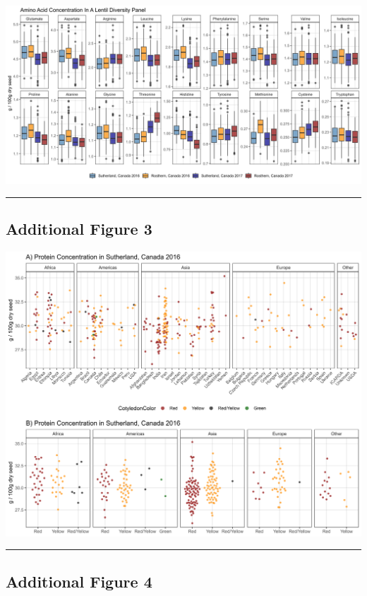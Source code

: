 \documentclass[
]{article}
\begin{document}
\includegraphics{Additional/Additional_Figure_02.jpg}

\begin{center}\rule{0.5\linewidth}{0.5pt}\end{center}

\hypertarget{additional-figure-3}{%
\subsection{Additional Figure 3}\label{additional-figure-3}}

\includegraphics{Additional/Additional_Figure_03.jpg}

\begin{center}\rule{0.5\linewidth}{0.5pt}\end{center}

\hypertarget{additional-figure-4}{%
\subsection{Additional Figure 4}\label{additional-figure-4}}
\end{document}
